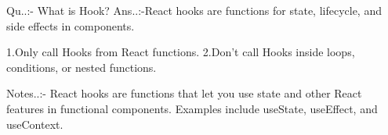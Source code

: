 Qu..:- What is Hook?
Ans..:-React hooks are functions for state, lifecycle, and side effects in components.

    1.Only call Hooks from React functions.
    2.Don’t call Hooks inside loops, conditions, or nested functions.

Notes..:- React hooks are functions that let you use state and other React features in functional components. Examples include useState, useEffect, and useContext.